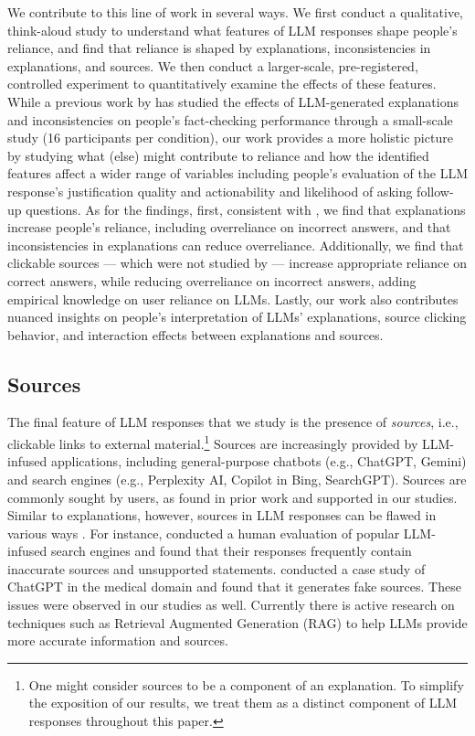 We contribute to this line of work in several ways. We first conduct a qualitative, think-aloud study to understand what features of LLM responses shape people's reliance, and find that reliance is shaped by explanations, inconsistencies in explanations, and sources. We then conduct a larger-scale, pre-registered, controlled experiment to quantitatively examine the effects of these features.
While a previous work by \citet{si2024fact} has studied the effects of LLM-generated explanations and inconsistencies on people's fact-checking performance through a small-scale study (16 participants per condition), our work provides a more holistic picture by studying what (else) might contribute to reliance and how the identified features affect a wider range of variables including people's evaluation of the LLM response's justification quality and actionability and likelihood of asking follow-up questions. 
As for the findings, first, consistent with \citet{si2024fact}, we find that explanations increase people's reliance, including overreliance on incorrect answers, and that inconsistencies in explanations can reduce overreliance. 
Additionally, we find that clickable sources --- which were not studied by \citet{si2024fact} --- increase appropriate reliance on correct answers, while reducing overreliance on incorrect answers, adding empirical knowledge on user reliance on LLMs. 
Lastly, our work also contributes nuanced insights on people's interpretation of LLMs' explanations, source clicking behavior, and interaction effects between explanations and sources.



\subsection{Sources}

The final feature of LLM responses that we study is the presence of \emph{sources}, i.e., clickable links to external material.\footnote{One might consider sources to be a component of an explanation. To simplify the exposition of our results, we treat them as a distinct component of LLM responses throughout this paper.} Sources are increasingly provided by LLM-infused applications, including general-purpose chatbots (e.g., ChatGPT, Gemini) and search engines (e.g., Perplexity AI, Copilot in Bing, SearchGPT). Sources are commonly sought by users, as found in prior work \cite{Kim2024ChatGPT} and supported in our studies. Similar to explanations, however, sources in LLM responses can be flawed in various ways \cite{liu2023evaluating,Alkaissi2023}. For instance, \citet{liu2023evaluating} conducted a human evaluation of popular LLM-infused search engines and found that their responses frequently contain inaccurate sources and unsupported statements. \citet{Alkaissi2023} conducted a case study of ChatGPT in the medical domain and found that it generates fake sources. These issues were observed in our studies as well. Currently there is active research on techniques such as Retrieval Augmented Generation (RAG) \cite{Lewis2020RAG,gao2024rag} to help LLMs provide more accurate information and sources.


